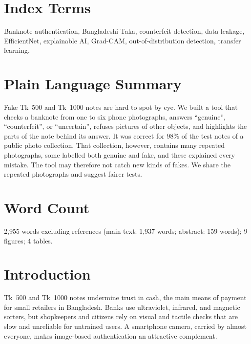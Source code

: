 \documentclass[journal]{IEEEtran}
\begin{document}
\section*{Index Terms}
Banknote authentication, Bangladeshi Taka, counterfeit detection, data leakage,
EfficientNet, explainable AI, Grad-CAM, out-of-distribution detection, transfer learning.

\section*{Plain Language Summary}
Fake Tk~500 and Tk~1000 notes are hard to spot by eye. We built a tool that checks a
banknote from one to six phone photographs, answers ``genuine'', ``counterfeit'', or
``uncertain'', refuses pictures of other objects, and highlights the parts of the note
behind its answer. It was correct for 98\% of the test notes of a public photo
collection. That collection, however, contains many repeated photographs, some labelled
both genuine and fake, and these explained every mistake. The tool may therefore not
catch new kinds of fakes. We share the repeated photographs and suggest fairer tests.

\section*{Word Count}
2{,}955 words excluding references (main text: 1{,}937 words; abstract: 159 words);
9 figures; 4 tables.

\section{Introduction}
\label{sec:intro}

 Tk~500 and Tk~1000 notes undermine trust in cash, the main
means of payment for small retailers in Bangladesh. Banks use ultraviolet, infrared, and
magnetic sorters, but shopkeepers and citizens rely on visual and tactile checks that are
slow and unreliable for untrained users. A smartphone camera, carried by almost
everyone, makes image-based authentication an attractive complement.
\end{document}
